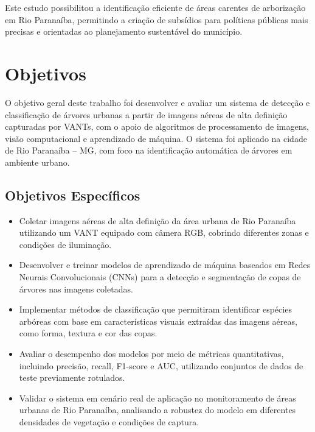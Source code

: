 \documentclass[
    12pt,
    openright,
    oneside,
    a4paper,
    sumario=tradicional,
    english,
    brazil,
    ]{abntex2}
\begin{document}
Este estudo possibilitou a identificação eficiente de áreas carentes de arborização em Rio Paranaíba, permitindo a criação de subsídios para políticas públicas mais precisas e orientadas ao planejamento sustentável do município.

\chapter{Objetivos}\label{sec:objetivos}

O objetivo geral deste trabalho foi desenvolver e avaliar um sistema de detecção e classificação de árvores urbanas a partir de imagens aéreas de alta definição capturadas por VANTs, com o apoio de algoritmos de processamento de imagens, visão computacional e aprendizado de máquina. O sistema foi aplicado na cidade de Rio Paranaíba -- MG, com foco na identificação automática de árvores em ambiente urbano.

\section{Objetivos Específicos}\label{sec:ObjetivosEspec}

\begin{itemize}

\item Coletar imagens aéreas de alta definição da área urbana de Rio Paranaíba utilizando um VANT equipado com câmera RGB, cobrindo diferentes zonas e condições de iluminação.

\item Desenvolver e treinar modelos de aprendizado de máquina baseados em Redes Neurais Convolucionais (CNNs) para a detecção e segmentação de copas de árvores nas imagens coletadas.

\item Implementar métodos de classificação que permitiram identificar espécies arbóreas com base em características visuais extraídas das imagens aéreas, como forma, textura e cor das copas.

\item Avaliar o desempenho dos modelos por meio de métricas quantitativas, incluindo precisão, recall, F1-score e AUC, utilizando conjuntos de dados de teste previamente rotulados.

\item Validar o sistema em cenário real de aplicação no monitoramento de áreas urbanas de Rio Paranaíba, analisando a robustez do modelo em diferentes densidades de vegetação e condições de captura.

\end{itemize}
\end{document}
